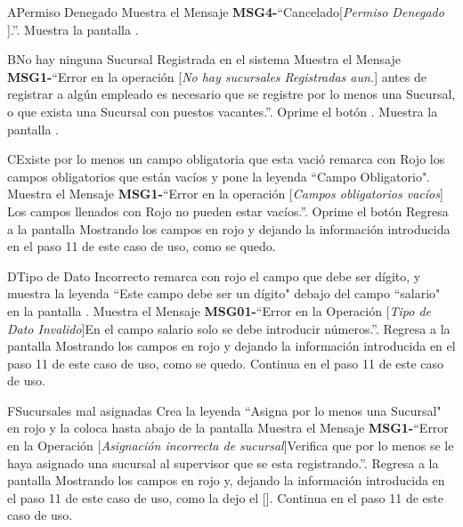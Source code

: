 	\begin{UCtrayectoriaA}{A}{Permiso Denegado}
			\UCpaso Muestra el Mensaje {\bf MSG4-}``Cancelado[{\em Permiso Denegado }].''.
			\UCpaso Muestra la pantalla .
		\end{UCtrayectoriaA}
		\begin{UCtrayectoriaA}{B}{No hay ninguna Sucursal Registrada en el sistema }
			\UCpaso Muestra el Mensaje {\bf MSG1-}``Error en la operación [{\em No hay sucursales Registradas aun.}] antes de registrar a algún empleado es necesario que se registre por lo menos una Sucursal, o que exista una Sucursal con puestos vacantes.''.
			\UCpaso[\UCactor] Oprime el botón .
			\UCpaso Muestra la pantalla .
		\end{UCtrayectoriaA}		
		\begin{UCtrayectoriaA}{C}{Existe por lo menos un campo obligatoria que esta vació}
			\UCpaso remarca con Rojo los campos obligatorios que están vacíos 
			y pone la leyenda ``Campo Obligatorio".
			\UCpaso Muestra el Mensaje {\bf MSG1-}``Error en la operación [{\em Campos obligatorios vacíos}] Los campos llenados con Rojo no pueden estar vacíos.''.
			\UCpaso[\UCactor] Oprime el botón 
			\UCpaso Regresa a la pantalla  Mostrando los campos en rojo y dejando la información introducida en el paso 11 de este caso de uso, como se quedo.
		\end{UCtrayectoriaA}
		\begin{UCtrayectoriaA}{D}{Tipo de Dato Incorrecto}
			\UCpaso remarca con rojo el campo que debe ser dígito, y muestra la leyenda ``Este campo debe ser un dígito" debajo del campo ``salario" en la  pantalla .
			\UCpaso Muestra el Mensaje {\bf MSG01-}``Error en la Operación [{\em Tipo de Dato Invalido}]En el campo salario solo se debe introducir números.''.
			\UCpaso Regresa a la pantalla  Mostrando los campos en rojo y dejando la información introducida en el paso 11 de este caso de uso, como se quedo.
			\UCpaso Continua en el paso 11 de este caso de uso.
		\end{UCtrayectoriaA}
		\begin{UCtrayectoriaA}{F}{Sucursales mal asignadas}
			\UCpaso Crea la leyenda ``Asigna por lo menos una Sucursal" en rojo y la coloca hasta abajo de la pantalla 
			\UCpaso Muestra el Mensaje {\bf MSG1-}``Error en la Operación [{\em Asignación incorrecta de sucursal}]Verifica que por lo menos se le haya asignado una sucursal al supervisor que se esta registrando.''.
			\UCpaso Regresa a la pantalla  Mostrando los campos en rojo y, dejando la información introducida en el paso 11 de este caso de uso, como la dejo el [\UCactor].
			\UCpaso Continua en el paso 11 de este caso de uso.
		\end{UCtrayectoriaA}